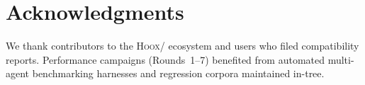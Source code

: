 \documentclass[11pt,a4paper]{article}
\begin{document}
\section*{Acknowledgments}

We thank contributors to the \textsc{Hoox}/\pyne{} ecosystem and users who
filed compatibility reports.
Performance campaigns (Rounds~1--7) benefited from automated multi-agent
benchmarking harnesses and regression corpora maintained in-tree.



\end{document}
